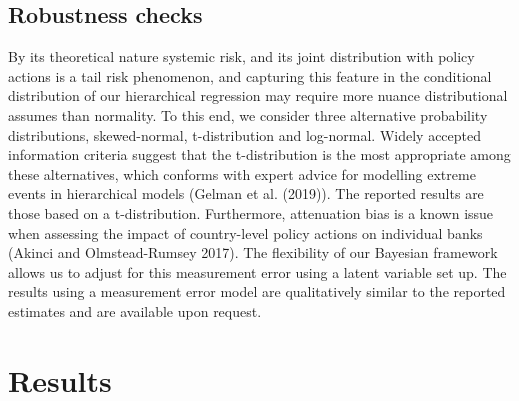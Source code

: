 \documentclass[
  10pt,
]{article}
\begin{document}
\hypertarget{robustness-checks}{%
\subsection{Robustness checks}\label{robustness-checks}}

By its theoretical nature systemic risk, and its joint distribution with
policy actions is a tail risk phenomenon, and capturing this feature in
the conditional distribution of our hierarchical regression may require
more nuance distributional assumes than normality. To this end, we
consider three alternative probability distributions, skewed-normal,
t-distribution and log-normal. Widely accepted information criteria
suggest that the t-distribution is the most appropriate among these
alternatives, which conforms with expert advice for modelling extreme
events in hierarchical models (Gelman et al. (2019)). The reported
results are those based on a t-distribution. Furthermore, attenuation
bias is a known issue when assessing the impact of country-level policy
actions on individual banks (Akinci and Olmstead-Rumsey 2017). The
flexibility of our Bayesian framework allows us to adjust for this
measurement error using a latent variable set up. The results using a
measurement error model are qualitatively similar to the reported
estimates and are available upon request.

\hypertarget{results}{%
\section{Results}\label{results}}
\end{document}
